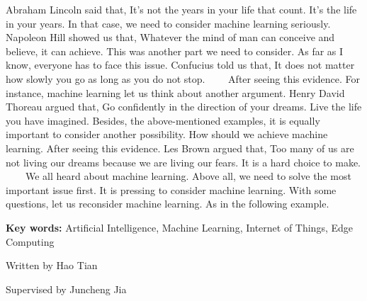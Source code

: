 
\begin{eabstract}
	Abraham Lincoln said that, It’s not the years in your life that count. It’s the life in your years. In that case, we need to consider machine learning seriously. Napoleon Hill showed us that, Whatever the mind of man can conceive and believe, it can achieve. This was another part we need to consider. As far as I know, everyone has to face this issue. Confucius told us that, It does not matter how slowly you go as long as you do not stop.
　　After seeing this evidence. For instance, machine learning let us think about another argument. Henry David Thoreau argued that, Go confidently in the direction of your dreams. Live the life you have imagined. Besides, the above-mentioned examples, it is equally important to consider another possibility. How should we achieve machine learning. After seeing this evidence. Les Brown argued that, Too many of us are not living our dreams because we are living our fears. It is a hard choice to make.
　　We all heard about machine learning. Above all, we need to solve the most important issue first. It is pressing to consider machine learning. With some questions, let us reconsider machine learning. As in the following example.

	\vskip 21bp
	{\bf{} Key words: }
	Artificial Intelligence,
	Machine Learning,
	Internet of Things,
	Edge Computing
\end{eabstract}

\begin{flushright}
	Written by Hao Tian
	
	Supervised by Juncheng Jia
\end{flushright}
